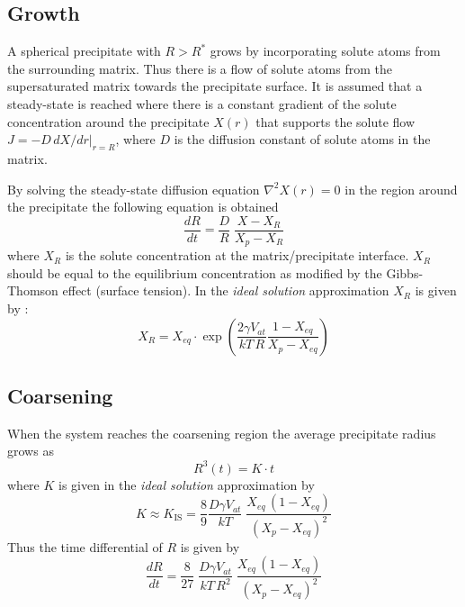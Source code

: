 \documentclass[12pt,a4paper]{article}
\begin{document}
\subsection{Growth}

A spherical precipitate with $R>R^*$ grows by incorporating solute atoms from the surrounding matrix. Thus there is a flow of solute atoms from the supersaturated matrix towards the precipitate surface. It is assumed that a steady-state is reached where there is a constant gradient of the solute concentration around the precipitate $X(r)$ that supports the solute flow $J = -D\,dX/dr |_{r=R}$, where $D$ is the diffusion constant of solute atoms in the matrix.

By solving the steady-state diffusion equation $\nabla^2 X(r)=0$ in the region around the precipitate the following equation is obtained
\begin{equation}
\frac{dR}{dt} = \frac{D}{R} \; \frac{X-X_R}{X_p-X_R}
\label{eq:growth}
\end{equation}
where $X_R$ is the solute concentration at the matrix/precipitate interface.
$X_R$ should be equal to the equilibrium concentration as modified by the Gibbs-Thomson effect (surface tension). In the \textit{ideal solution} approximation $X_R$ is given by \citep{Calderon-1994-Ostwaldripeningin}:
\begin{equation}
X_R =  X_{eq} \cdot \exp \left( \frac{2\gamma V_{at}}{kT\, R} \frac{1-X_{eq}}{X_p - X_{eq}}\right) 
\end{equation}

\subsection{Coarsening}

When the system reaches the coarsening region the average precipitate radius grows as
\begin{equation}
R^3(t) = K\cdot t
\end{equation}
where $K$ is given in the \textit{ideal solution} approximation by \citep{Calderon-1994-Ostwaldripeningin}
\begin{equation}
K\approx K_{\text{IS}} = \frac{8}{9}\frac{D \gamma V_{at}}{kT}\;
\frac{X_{eq}\, (1-X_{eq})}{(X_p - X_{eq} )^2}
\end{equation}
Thus the time differential of $R$ is given by
\begin{equation}
\frac{dR}{dt} = \frac{8}{27}\;
\frac{D \gamma V_{at}}{kT\,R^2}\;
\frac{X_{eq}\, (1-X_{eq})}{(X_p - X_{eq} )^2}
\end{equation}
\end{document}
